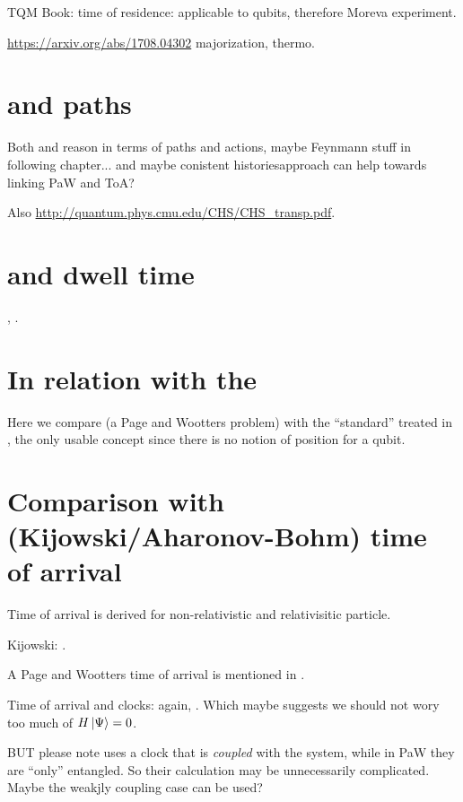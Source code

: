 TQM Book: time of residence: applicable to qubits, therefore Moreva experiment.

\url{https://arxiv.org/abs/1708.04302} majorization, thermo.

\section{and paths}

Both \cite{YearsleyHalliwell_Clocks} and \cite{Gambini_PW}
reason in terms of paths and actions, maybe Feynmann stuff
in following chapter... and maybe conistent historiesapproach can help
towards linking PaW and ToA?

Also \url{http://quantum.phys.cmu.edu/CHS/CHS_transp.pdf}.

\section{and dwell time}

\cite[\S 5]{TQM2}, \cite{YearsleyHalliwell_Clocks}.

\section{In relation with the }

Here we compare \cite{Moreva:synthetic, Moreva:illustration}
(a Page and Wootters problem)
with the ``standard'' 
treated in \cite[\S 5.5.2]{TQM2},
the only usable concept since there is no notion of position
for a qubit.

\section{Comparison with (Kijowski/Aharonov-Bohm) time of arrival}

Time of arrival is derived for non-relativistic \parencite{Delgado_TOA, Delgado_TOA2}
and relativisitic \parencite{Leon_TOA_R}
particle.

Kijowski: \cite{Kijowski_Time, Kijowski_Comment}.

A Page and Wootters time of arrival is mentioned in \cite{Gambini_PW}.

Time of arrival and clocks: again, \cite{YearsleyHalliwell_Clocks}.
Which maybe suggests we should not wory too much of $H\ket{\Psi} = 0$. 

BUT please note \cite{YearsleyHalliwell_Clocks} uses a clock that is
\emph{coupled} with the system, while in PaW they are ``only'' entangled.
So their calculation may be unnecessarily complicated.
Maybe the weakjly coupling case can be used?

